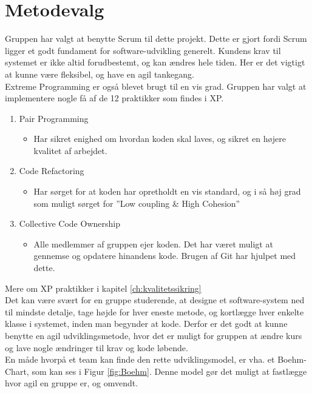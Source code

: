 \section{Metodevalg}\label{sec:valgafvaektoej}
Gruppen har valgt at benytte Scrum til dette projekt. Dette er gjort fordi Scrum ligger et godt fundament 
for software-udvikling generelt. Kundens krav til systemet er ikke altid forudbestemt, og kan ændres hele tiden. 
Her er det vigtigt at kunne være fleksibel, og have en agil tankegang. \\
Extreme Programming er også blevet brugt til en vis grad. Gruppen har valgt at implementere nogle få 
af de 12 praktikker som findes i XP. 
\begin{enumerate}
    \item Pair Programming
    \begin{itemize}
        \item Har sikret enighed om hvordan koden skal laves, og sikret en højere kvalitet af arbejdet.
    \end{itemize}

    \item Code Refactoring
    \begin{itemize}
        \item Har sørget for at koden har opretholdt en vis standard, og i så høj grad som muligt sørget for ”Low coupling \& High Cohesion”
    \end{itemize}
    
    \item Collective Code Ownership
    \begin{itemize}
        \item Alle medlemmer af gruppen ejer koden. Det har været muligt at gennemse og opdatere hinandens kode. 
        Brugen af Git har hjulpet med dette. 
    \end{itemize}
\end{enumerate}

Mere om XP praktikker i kapitel \ref{ch:kvalitetssikring}\\

Det kan være svært for en gruppe studerende, at designe et software-system ned til mindste detalje, 
tage højde for hver eneste metode, og kortlægge hver enkelte klasse i systemet, inden man begynder at kode. 
Derfor er det godt at kunne benytte en agil udviklingsmetode, hvor det er muligt for gruppen at ændre kurs og 
lave nogle ændringer til krav og kode løbende. \\
En måde hvorpå et team kan finde den rette udviklingsmodel, er vha. et Boehm-Chart, som kan ses i Figur \ref{fig:Boehm}. 
Denne model gør det muligt at fastlægge hvor agil en gruppe er, og omvendt. \\


